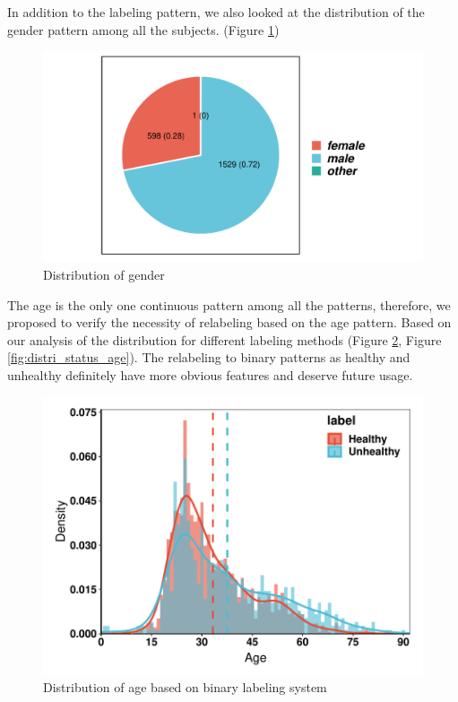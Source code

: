 \documentclass[11pt]{article}
\begin{document}
In addition to the labeling pattern, we also looked at the distribution of the gender pattern among all the subjects. (Figure \ref{fig:pie_gender})

\begin{figure}[htbp]{}
	\centering
    \includegraphics[width=.8\textwidth]{./imgs/pie_gender.pdf} %
    \caption{Distribution of gender}
    \label{fig:pie_gender}
\end{figure}

The age is the only one continuous pattern among all the patterns, therefore, we proposed to verify the necessity of relabeling based on the age pattern. Based on our analysis of the distribution for different labeling methods (Figure \ref{fig:distri_label_age}, Figure \ref{fig:distri_status_age}). The relabeling to binary patterns as healthy and unhealthy definitely have more obvious features and deserve future usage.

\begin{figure}[htbp]{}
	\centering
    \includegraphics[width=.8\textwidth]{./imgs/distri_label_age.pdf} %
    \caption{Distribution of age based on binary labeling system}
    \label{fig:distri_label_age}
\end{figure}
\end{document}
